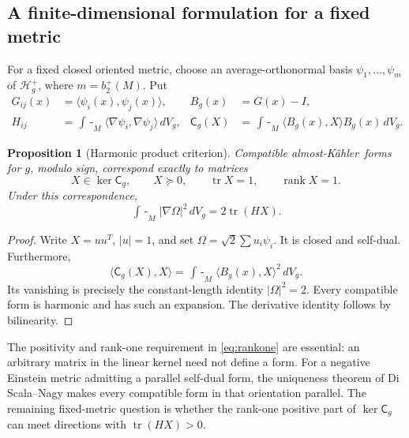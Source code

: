\documentclass[11pt,a4paper]{article}
\newtheorem{proposition}[theorem]{Proposition}
\theoremstyle{definition}
\theoremstyle{remark}
\newcommand{\tr}{\operatorname{tr}}
\newcommand{\rank}{\operatorname{rank}}
\newcommand{\dd}{\,dV_g}
\newcommand{\avint}{\mathop{\int\!\!\!-}}
\newcommand{\AK}{almost-K\"ahler}
\begin{document}
\subsection{A finite-dimensional formulation for a fixed metric}
For a fixed closed oriented metric, choose an average-orthonormal basis $\psi_1,\ldots,\psi_m$ of $\mathcal H_g^+$, where $m=b_2^+(M)$. Put
\begin{align*}
 G_{ij}(x)&=\langle\psi_i(x),\psi_j(x)\rangle,& B_g(x)&=G(x)-I,\\
 H_{ij}&=\avint_M\langle\nabla\psi_i,\nabla\psi_j\rangle\dd,&
 \mathsf C_g(X)&=\avint_M\langle B_g(x),X\rangle B_g(x)\dd.
\end{align*}
\begin{proposition}[Harmonic product criterion]\label{prop:harmonic}
Compatible \AK\ forms for $g$, modulo sign, correspond exactly to matrices
\begin{equation}\label{eq:rankone}
 X\in\ker\mathsf C_g,\qquad X\succeq0,\qquad \tr X=1,\qquad \rank X=1.
\end{equation}
Under this correspondence,
\[
 \avint_M|\nabla\Omega|^2\dd=2\tr(HX).
\]
\end{proposition}
\begin{proof}
Write $X=uu^T$, $|u|=1$, and set $\Omega=\sqrt2\sum u_i\psi_i$. It is closed and self-dual. Furthermore,
\[
 \langle\mathsf C_g(X),X\rangle=\avint_M\langle B_g(x),X\rangle^2\dd.
\]
Its vanishing is precisely the constant-length identity $|\Omega|^2=2$. Every compatible form is harmonic and has such an expansion. The derivative identity follows by bilinearity.
\end{proof}
The positivity and rank-one requirement in \eqref{eq:rankone} are essential: an arbitrary matrix in the linear kernel need not define a form. For a negative Einstein metric admitting a parallel self-dual form, the uniqueness theorem of Di Scala--Nagy \cite{DSN} makes every compatible form in that orientation parallel. The remaining fixed-metric question is whether the rank-one positive part of $\ker\mathsf C_g$ can meet directions with $\tr(HX)>0$.
\end{document}

